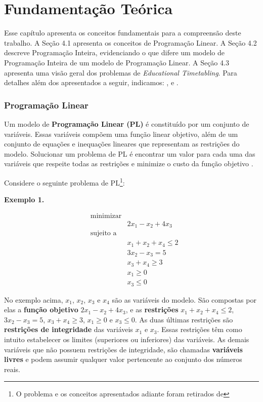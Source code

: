 \chapter{Fundamentação Teórica}
\label{cap:fundamentacao-teorica}

Esse capítulo apresenta os conceitos fundamentais para a compreensão deste trabalho. A Seção 4.1 apresenta os conceitos de Programação Linear. A Seção 4.2 descreve Programação Inteira, evidenciando o que difere um modelo de Programação Inteira de um modelo de Programação Linear. A Seção 4.3 apresenta uma visão geral dos problemas de \textit{Educational Timetabling}. Para detalhes além dos apresentados a seguir, indicamos: ,   e .

\subsection{Programação Linear}

Um modelo de \textbf{Programação Linear (PL)} é constituído por um conjunto de variáveis. Essas variáveis compõem uma função linear objetivo, além de um conjunto de equações e inequações lineares que representam as restrições do modelo. Solucionar um problema de PL é encontrar um valor para cada uma das variáveis que respeite todas as restrições e minimize o custo da função objetivo \cite{bertsimas1997introduction}. 

Considere o seguinte problema de PL\footnote{O problema e os conceitos apresentados adiante foram retirados de }:

\textbf{Exemplo 1.}

\begin{equation*}
\begin{aligned}
& \text{minimizar} \\
& &  2x_1 - x_2 + 4x_3 \\
& \text{sujeito a} \\
& & x_1 + x_2 + x_4 \leq 2 \\
& & 3x_2 - x_3 = 5 \\
& & x_3 + x_4 \geq 3 \\
& & x_1 \geq 0 \\ 
& & x_3 \leq 0
\end{aligned}
\end{equation*}

No exemplo acima, $x_1$, $x_2$, $x_3$ e $x_4$ são as variáveis do modelo. São compostas por elas a \textbf{função objetivo} $2x_1 - x_2 + 4x_3$, e as \textbf{restrições} $x_1 + x_2 + x_4 \leq 2$, $3x_2 - x_3 = 5$, $x_3 + x_4 \geq 3$, $x_1 \geq 0$ e $x_3 \leq 0$. As duas últimas restrições são \textbf{restrições de integridade} das variáveis $x_1$ e $x_3$. Essas restrições têm como intuito estabelecer os limites (superiores ou inferiores) das variáveis. As demais variáveis que não possuem restrições de integridade, são chamadas \textbf{variáveis livres} e podem assumir qualquer valor  pertencente ao conjunto dos números reais. 

